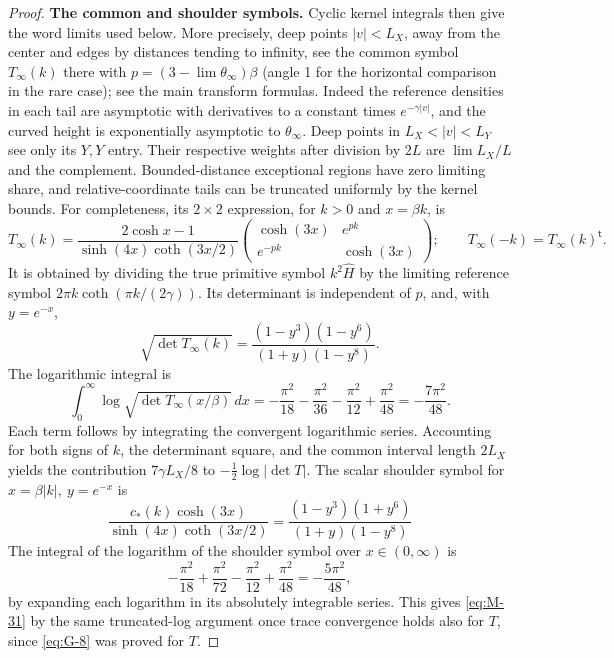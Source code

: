 \begin{proof}
\par\smallskip\noindent\textbf{The common and shoulder symbols.}
Cyclic kernel integrals then
give the word limits used below. More precisely, deep points \(|v|<L_X\), away from the center and edges by distances tending to infinity, see the common symbol \(T_\infty(k)\) there with \(p=(3-\lim\theta_\infty)\beta\) (angle 1 for the horizontal comparison in the rare case); see the main transform formulas. Indeed the reference densities in each tail are asymptotic with derivatives to a constant times \(e^{-\gamma |v|}\), and the curved height is exponentially asymptotic to \(\theta_\infty\). Deep points in \(L_X<|v|<L_Y\) see only its \(Y,Y\) entry. Their respective weights after division by \(2L\) are \(\lim L_X/L\) and the complement. Bounded-distance exceptional regions have zero limiting share, and relative-coordinate tails can be truncated uniformly by the kernel bounds. For completeness, its $2\times2$ expression, for $k>0$ and
$x=\beta k$, is
\[
 T_\infty(k)=\frac{2\cosh x-1}{\sinh(4x)\coth(3x/2)}
 \begin{pmatrix}\cosh(3x)&e^{pk}\\ e^{-pk}&\cosh(3x)\end{pmatrix};
 \qquad T_\infty(-k)=T_\infty(k)^{\mathsf t}.
\]
It is obtained by dividing the true primitive symbol $k^2\widehat H$
by the limiting reference symbol $2\pi k\coth(\pi k/(2\gamma))$.
Its determinant is independent of $p$, and, with $y=e^{-x}$,
\[
 \sqrt{\det T_\infty(k)}
 =\frac{(1-y^3)(1-y^6)}{(1+y)(1-y^8)}.
\]
The logarithmic integral is
\[
 \int_0^\infty\log\sqrt{\det T_\infty(x/\beta)}\,dx
 =-\frac{\pi^2}{18}-\frac{\pi^2}{36}
       -\frac{\pi^2}{12}+\frac{\pi^2}{48}
 =-\frac{7\pi^2}{48}.
\]
Each term follows by integrating the convergent logarithmic series.
Accounting for both signs of $k$, the determinant square, and the
common interval length $2L_X$ yields the contribution
$7\gamma L_X/8$ to $-\frac12\log|\det T|$.
The scalar shoulder symbol for \(x=\beta|k|,\ y=e^{-x}\) is
\[
 \frac{c_*(k)\cosh(3x)}{\sinh(4x)\coth(3x/2)}
 =\frac{(1-y^3)(1+y^6)}{(1+y)(1-y^8)}
\]
The integral of the logarithm of the shoulder symbol over
\(x\in(0,\infty)\) is
\[
 -\frac{\pi^2}{18}+\frac{\pi^2}{72}
 -\frac{\pi^2}{12}+\frac{\pi^2}{48}
 =-\frac{5\pi^2}{48},
\]
by expanding each logarithm in its absolutely integrable series. This gives \eqref{eq:M-31} by the same truncated-log argument once trace convergence holds also for \(T\), since \eqref{eq:G-8} was proved for \(T\).


\end{proof}
